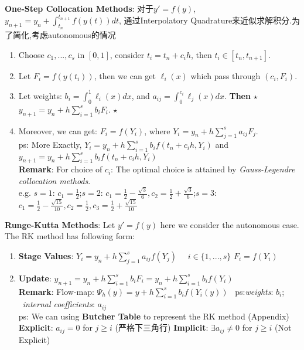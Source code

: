 \documentclass[9pt]{article}
\begin{document}
\textbf{One-Step Collocation Methods}: {\footnotesize 对于$y'=f(y)$, $y_{n+1}=y_n+\int_{t_n}^{t_{n+1}}f(y(t))dt$, 通过Interpolatory Quadrature来近似求解积分.}{\tiny 为了简化,考虑autonomous的情况}

\begin{enumerate}[itemsep=-2pt, topsep=-2pt]
    \item Choose $c_1,...,c_s$ in $[0,1]$, consider $t_i=t_n+c_ih$, then $t_i\in[t_n,t_{n+1}]$.
    \item Let $F_i=f(y(t_i))$, then we can get $\ell_i(x)$ which pass through $(c_i,F_i)$.
    \item Let weights: $b_i=\int_0^1\ell_i(x)dx$, and $a_{ij}=\int_0^{c_i}\ell_j(x)dx$. \quad \textbf{Then} $\star$ $y_{n+1}=y_n+h\sum_{i=1}^{s}b_iF_i$. $\star$
    \item Moreover, we can get: $F_i=f(Y_i)$, where $Y_i=y_n+h\sum_{j=1}^{s}a_{ij}F_j$. \\
    ps: More Exactly, $Y_i=y_n+h\sum^s_{i=1}b_if(t_n+c_ih,Y_i)$ and $y_{n+1}=y_n+h\sum_{i=1}^sb_if(t_n+c_ih,Y_i)$ \\
    \textbf{Remark}: {\footnotesize For choice of $c_i$: The optimal choice is attained by \textit{Gauss-Legendre collocation methods}}. \\
    {\scriptsize e.g. $s=1$: $c_1=\frac{1}{2}$;\qquad $s=2$: $c_1=\frac{1}{2}-\frac{\sqrt{3}}{6},c_2=\frac{1}{2}+\frac{\sqrt{3}}{6}$;\qquad $s=3$: $c_1=\frac{1}{2}-\frac{\sqrt{15}}{10},c_2=\frac{1}{2},c_3=\frac{1}{2}+\frac{\sqrt{15}}{10}$}
\end{enumerate}

\textbf{Runge-Kutta Methods}: Let $y'=f(y)$ here we consider the autonomous case. The RK method has following form:

\begin{enumerate}[itemsep=-2pt, topsep=-2pt]
    \item \textbf{Stage Values}: $Y_i=y_n+h\sum_{j=1}^{s}a_{ij}f(Y_{j})$ \ \ $i\in\{1,...,s\}$ \qquad $F_i=f(Y_i)$
    \item \textbf{Update}: $y_{n+1}=y_n+h\sum_{i=1}^{s}b_iF_i=y_n+h\sum_{i=1}^{s}b_if(Y_i)$  \\
    \textbf{Remark}: Flow-map: $\Psi_{h}(y)=y+h\sum_{i=1}^{s}b_if(Y_i(y))$ \qquad \ {\scriptsize ps:\textit{weights}: $b_i$; \ \textit{internal coefficients}: $a_{ij}$} \\
    \small{ps: We can using \textbf{Butcher Table} to represent the RK method (Appendix) \\
    \textbf{Explicit}: $a_{ij}=0$ for $j\geq i$ { (严格下三角行)} \quad \textbf{Implicit}: $\exists a_{ij}\ne0$ for $j\geq i$ (Not Explicit)}
\end{enumerate}
\end{document}
